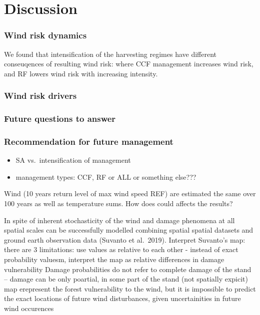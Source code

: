 \documentclass[]{elsarticle} %
\providecommand{\tightlist}{%
  \setlength{\itemsep}{0pt}\setlength{\parskip}{0pt}}
\begin{document}
\hypertarget{discussion}{%
\section{Discussion}\label{discussion}}

\hypertarget{wind-risk-dynamics}{%
\subsubsection{Wind risk dynamics}\label{wind-risk-dynamics}}

We found that intensification of the harvesting regimes have different conseuqences of resulting wind risk: where CCF management increases wind risk, and RF lowers wind risk with increasing intensity.

\hypertarget{wind-risk-drivers}{%
\subsubsection{Wind risk drivers}\label{wind-risk-drivers}}

\hypertarget{future-questions-to-answer}{%
\subsubsection{Future questions to answer}\label{future-questions-to-answer}}

\hypertarget{recommendation-for-future-management}{%
\subsubsection{Recommendation for future management}\label{recommendation-for-future-management}}

\begin{itemize}
\tightlist
\item
  SA vs.~intensification of management
\item
  management types: CCF, RF or ALL or something else???
\end{itemize}

Wind (10 years return level of max wind speed REF) are estimated the same over 100 years as well as temperature sums. How does could affects the results?

In spite of inherent stochasticity of the wind and damage phenomena at all spatial scales can be successfully modelled combining spatial spatial datasets and ground earth observation data (Suvanto et al.~2019).
Interpret Suvanto's map: there are 3 limitations:
use values as relative to each other - instead of exact probability valuesm, interpret the map as relative differences in damage vulnerability
Damage probabilities do not refer to complete damage of the stand -- damage can be only poartial, in some part of the stand (not spatially expicit)
map erepresent the forest vulnerability to the wind, but it is impossible to predict the exact locations of future wind disturbances, given uncertainities in future wind occurences
\end{document}
